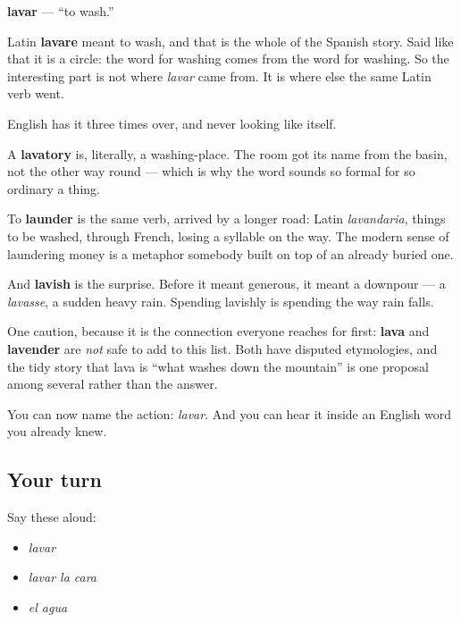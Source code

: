 \begin{cousinweb}
\textbf{lavar} — \textquotedblleft{}to wash.\textquotedblright{}

Latin \textbf{lavare} meant to wash, and that is the whole of the Spanish story. Said like that it is a circle: the word for washing comes from the word for washing. So the interesting part is not where \emph{lavar} came from. It is where else the same Latin verb went.

English has it three times over, and never looking like itself.

A \textbf{lavatory} is, literally, a washing-place. The room got its name from the basin, not the other way round — which is why the word sounds so formal for so ordinary a thing.

To \textbf{launder} is the same verb, arrived by a longer road: Latin \emph{lavandaria}, things to be washed, through French, losing a syllable on the way. The modern sense of laundering money is a metaphor somebody built on top of an already buried one.

And \textbf{lavish} is the surprise. Before it meant generous, it meant a downpour — a \emph{lavasse}, a sudden heavy rain. Spending lavishly is spending the way rain falls.

One caution, because it is the connection everyone reaches for first: \textbf{lava} and \textbf{lavender} are \emph{not} safe to add to this list. Both have disputed etymologies, and the tidy story that lava is \textquotedblleft{}what washes down the mountain\textquotedblright{} is one proposal among several rather than the answer.
\end{cousinweb}

\begin{grammarlens}[title={What you've built}]
You can now name the action: \emph{lavar}. And you can hear it inside an English word you already knew.
\end{grammarlens}

\subsection*{Your turn}
Say these aloud:

\begin{itemize}
\raggedright
  \item \emph{lavar}
  \item \emph{lavar la cara}
  \item \emph{el agua}
\end{itemize}

